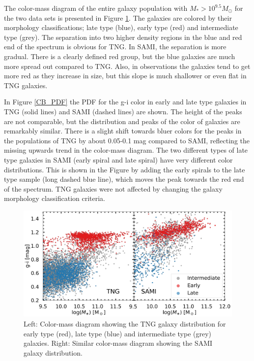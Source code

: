 The color-mass diagram of the entire galaxy population with $M_\ast > 10^{9.5}M_{\odot}$ for the two data sets is presented in Figure \ref{CB}. The galaxies are colored by their morphology classifications; late type (blue), early type (red) and intermediate type (grey). The separation into two higher density regions in the blue and red end of the spectrum is obvious for TNG. In SAMI, the separation is more gradual. There is a clearly defined red group, but the blue galaxies are much more spread out compared to TNG. Also, in observations the galaxies tend to get more red as they increase in size, but this slope is much shallower or even flat in TNG galaxies.

In Figure \ref{CB_PDF} the PDF for the g-i color in early and late type galaxies in TNG (solid lines) and SAMI (dashed lines) are shown. The height of the peaks are not comparable, but the distribution and peaks of the color of galaxies are remarkably similar. There is a slight shift towards bluer colors for the peaks in the populations of TNG by about 0.05-0.1 mag compared to SAMI, reflecting the missing upwards trend in the color-mass diagram. The two different types of late type galaxies in SAMI (early spiral and late spiral) have very different color distributions. This is shown in the Figure by adding the early spirals to the late type sample (long dashed blue line), which moves the peak towards the red end of the spectrum. TNG galaxies were not affected by changing the galaxy morphology classification criteria.


\begin{figure}
    \centering
    \includegraphics[width=\textwidth]{images/CB.png}
    \caption{Left: Color-mass diagram showing the TNG galaxy distribution for early type (red), late type (blue) and intermediate type (grey) galaxies. Right: Similar color-mass diagram showing the SAMI galaxy distribution.}
    \label{CB}
\end{figure}


